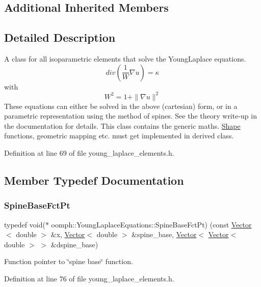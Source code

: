 \subsection*{Additional Inherited Members}


\subsection{Detailed Description}
A class for all isoparametric elements that solve the Young\+Laplace equations. \[ div (\frac{1}{W} \nabla u) = \kappa \] with \[ W^2=1+\|\nabla u\|^2 \] These equations can either be solved in the above (cartesian) form, or in a parametric representation using the method of spines. See the theory write-\/up in the documentation for details. This class contains the generic maths. \hyperlink{classoomph_1_1Shape}{Shape} functions, geometric mapping etc. must get implemented in derived class. 

Definition at line 69 of file young\+\_\+laplace\+\_\+elements.\+h.



\subsection{Member Typedef Documentation}
\mbox{\label{classoomph_1_1YoungLaplaceEquations_a5e09288f5d3b710f23e8e57401a48ccc}} 
\subsubsection{\texorpdfstring{Spine\+Base\+Fct\+Pt}{SpineBaseFctPt}}
{\footnotesize\ttfamily typedef void($\ast$ oomph\+::\+Young\+Laplace\+Equations\+::\+Spine\+Base\+Fct\+Pt) (const \hyperlink{classoomph_1_1Vector}{Vector}$<$ double $>$ \&x, \hyperlink{classoomph_1_1Vector}{Vector}$<$ double $>$ \&spine\+\_\+base, \hyperlink{classoomph_1_1Vector}{Vector}$<$ \hyperlink{classoomph_1_1Vector}{Vector}$<$ double $>$ $>$ \&dspine\+\_\+base)}



Function pointer to \char`\"{}spine base\char`\"{} function. 



Definition at line 76 of file young\+\_\+laplace\+\_\+elements.\+h.

